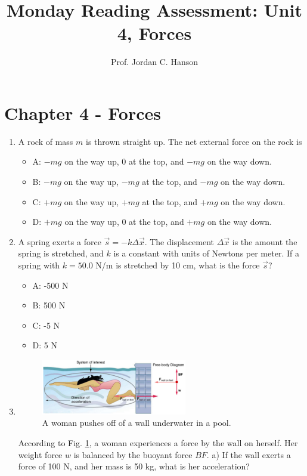 \documentclass{article}
\begin{document}
\title{Monday Reading Assessment: Unit 4, Forces}
\author{Prof. Jordan C. Hanson}

\maketitle

\section{Chapter 4 - Forces}

\begin{enumerate}
\item A rock of mass $m$ is thrown straight up. The net external force on the rock is
\begin{itemize}
\item A: $-mg$ on the way up, 0 at the top, and $-mg$ on the way down.
\item B: $-mg$ on the way up, $-mg$ at the top, and $-mg$ on the way down.
\item C: $+mg$ on the way up, $+mg$ at the top, and $+mg$ on the way down.
\item D: $+mg$ on the way up, 0 at the top, and $+mg$ on the way down.
\end{itemize}
\item A spring exerts a force $\vec{s} = -k \Delta\vec{x}$.  The displacement $\Delta\vec{x}$ is the amount the spring is stretched, and $k$ is a constant with units of Newtons per meter.  If a spring with $k = 50.0$ N/m is stretched by 10 cm, what is the force $\vec{s}$?
\begin{itemize}
\item A: -500 N
\item B: 500 N
\item C: -5 N
\item D: 5 N
\end{itemize}
\item 
\begin{figure}[ht]
\centering
\includegraphics[width=0.6\textwidth]{wall.png}
\caption{\label{fig:wall} A woman pushes off of a wall underwater in a pool.}
\end{figure}
According to Fig. \ref{fig:wall}, a woman experiences a force by the wall on herself.  Her weight force $w$ is balanced by the buoyant force $BF$.  a) If the wall exerts a force of 100 N, and her mass is 50 kg, what is her acceleration?
\end{enumerate}
\end{document}

